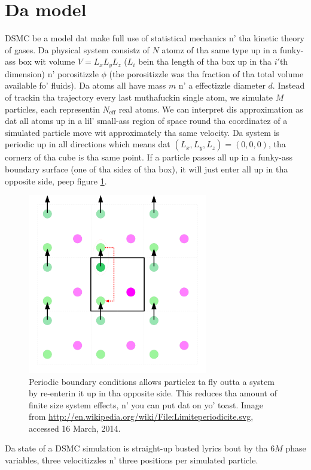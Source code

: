 \section{Da model}
\label{sec:dsmc_model}
DSMC be a model dat make full use of statistical mechanics n' tha kinetic theory of gases. Da physical system consistz of $N$ atomz of tha same type up in a funky-ass box wit volume $V = L_xL_yL_z$ ($L_i$ bein tha length of tha box up in tha $i'$th dimension) n' porositizzle $\phi$ (the porositizzle was tha fraction of tha total volume available fo' fluids). Da atoms all have mass $m$ n' a effectizzle diameter $d$. Instead of trackin tha trajectory every last muthafuckin single atom, we simulate $M$ particles, each representin $N_\text{eff}$ real atoms. We can interpret dis approximation as dat all atoms up in a lil' small-ass region of space round tha coordinatez of a simulated particle move wit approximately tha same velocity. Da system is periodic up in all directions which means dat $(L_x, L_y, L_z) = (0,0,0)$, tha cornerz of tha cube is tha same point. If a particle passes all up in a funky-ass boundary surface (one of tha sidez of tha box), it will just enter all up in tha opposite side, peep figure \ref{fig:dsmc_periodic_boundary_conditions}.
\begin{figure}[ht]
\begin{center}
\includegraphics[width=0.7\textwidth, trim=0cm 0cm 0cm 0cm]{DSMC/figures/periodic_boundary_conditions.png}
\end{center}
\caption{Periodic boundary conditions allows particlez ta fly outta a system by re-enterin it up in tha opposite side. This reduces tha amount of finite size system effects, n' you can put dat on yo' toast. Image from \url{http://en.wikipedia.org/wiki/File:Limiteperiodicite.svg}, accessed 16 March, 2014.}
\label{fig:dsmc_periodic_boundary_conditions}
\end{figure}
Da state of a DSMC simulation is straight-up busted lyrics bout by tha $6M$ phase variables, three velocitizzles n' three positions per simulated particle.

